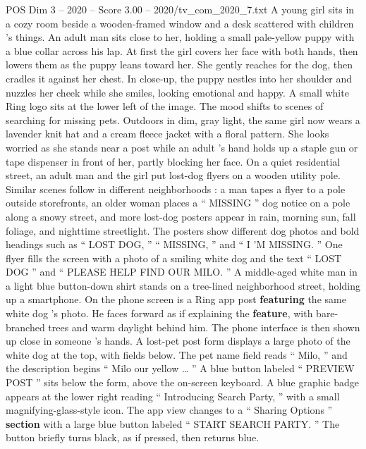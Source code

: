 \begin{textsample}{POS Dim 3 – 2020 – Score 3.00 – 2020/tv\_com\_2020\_7.txt}  \label{ex:f3_pos_079}
A young girl sits in a cozy room beside a wooden-framed window and a desk scattered with children ’s things.
An adult man sits close to her, holding a small pale-yellow puppy with a blue collar across his lap.
At first the girl covers her face with both hands, then lowers them as the puppy leans toward her.
She gently reaches for the dog, then cradles it against her chest.
In close-up, the puppy nestles into her shoulder and nuzzles her cheek while she smiles, looking emotional and happy.
A small white Ring logo sits at the lower left of the image.
The mood shifts to scenes of searching for missing pets.
Outdoors in dim, gray light, the same girl now wears a lavender knit hat and a cream fleece jacket with a floral pattern.
She looks worried as she stands near a post while an adult ’s hand holds up a staple gun or tape dispenser in front of her, partly blocking her face.
On a quiet residential street, an adult man and the girl put lost-dog flyers on a wooden utility pole.
Similar scenes follow in different neighborhoods : a man tapes a flyer to a pole outside storefronts, an older woman places a “ MISSING ” dog notice on a pole along a snowy street, and more lost-dog posters appear in rain, morning sun, fall foliage, and nighttime streetlight.
The posters show different dog photos and bold headings such as “ LOST DOG, ” “ MISSING, ” and “ I ’M MISSING. ” One flyer fills the screen with a photo of a smiling white dog and the text “ LOST DOG ” and “ PLEASE HELP FIND OUR MILO. ” A middle-aged white man in a light blue button-down shirt stands on a tree-lined neighborhood street, holding up a smartphone.
On the phone screen is a Ring app post \textbf{featuring} the same white dog ’s photo.
He faces forward as if explaining the \textbf{feature}, with bare-branched trees and warm daylight behind him.
The phone interface is then shown up close in someone ’s hands.
A lost-pet post form displays a large photo of the white dog at the top, with fields below.
The pet name field reads “ Milo, ” and the description begins “ Milo our yellow … ” A blue button labeled “ PREVIEW POST ” sits below the form, above the on-screen keyboard.
A blue graphic badge appears at the lower right reading “ Introducing Search Party, ” with a small magnifying-glass-style icon.
The app view changes to a “ Sharing Options ” \textbf{section} with a large blue button labeled “ START SEARCH PARTY. ” The button briefly turns black, as if pressed, then returns blue.

\end{textsample}
